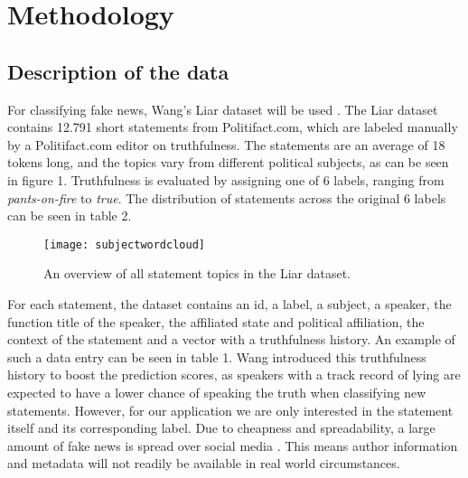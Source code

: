 \section{Methodology}

\subsection{Description of the data}
For classifying fake news, Wang's Liar dataset will be used \cite{wang2018}. 
The Liar dataset contains 12.791 short statements from Politifact.com, which are labeled manually by a Politifact.com editor on truthfulness. 
The statements are an average of 18 tokens long, and the topics vary from different political subjects, as can be seen in figure 1.
Truthfulness is evaluated by assigning one of 6 labels, ranging from \textit{pants-on-fire} to \textit{true}. 
The distribution of statements across the original 6 labels can be seen in table 2.

\begin{figure}[h]
    \centering
    \texttt{[image: subjectwordcloud]}
    \caption{An overview of all statement topics in the Liar dataset.}
\end{figure}

For each statement, the dataset contains an id, a label, a subject, a speaker, the function title of the speaker, the affiliated state and political affiliation, the context of the statement and a vector with a truthfulness history.
An example of such a data entry can be seen in table 1.
Wang introduced this truthfulness history to boost the prediction scores, as speakers with a track record of lying are expected to have a lower chance of speaking the truth when classifying new statements.
However, for our application we are only interested in the statement itself and its corresponding label. 
Due to cheapness and spreadability, a large amount of fake news is spread over social media \cite{shu2017}. 
This means author information and metadata will not readily be available in real world circumstances.

